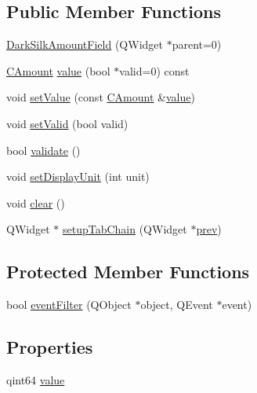 \subsection*{Public Member Functions}
\begin{DoxyCompactItemize}
\item 
\hyperlink{class_dark_silk_amount_field_af3f4dac6cb74424b4c34113a65b0f1dc}{Dark\+Silk\+Amount\+Field} (Q\+Widget $\ast$parent=0)
\item 
\hyperlink{amount_8h_a4eaf3a5239714d8c45b851527f7cb564}{C\+Amount} \hyperlink{class_dark_silk_amount_field_a4d844a57eacd9ce9e0f3e665d0286875}{value} (bool $\ast$valid=0) const 
\item 
void \hyperlink{class_dark_silk_amount_field_af42cc558d9d38dfc7ce682cb8f01ed20}{set\+Value} (const \hyperlink{amount_8h_a4eaf3a5239714d8c45b851527f7cb564}{C\+Amount} \&\hyperlink{class_dark_silk_amount_field_ae533a06697225e95bade6a9df1c6b5d2}{value})
\item 
void \hyperlink{class_dark_silk_amount_field_acaeddf879d2dd948e232d0d7db80672b}{set\+Valid} (bool valid)
\item 
bool \hyperlink{class_dark_silk_amount_field_a6e48d59e5cf6de6469d3abddc7ac1aa2}{validate} ()
\item 
void \hyperlink{class_dark_silk_amount_field_a11567d5cc0b2012727bd915b7d8742c2}{set\+Display\+Unit} (int unit)
\item 
void \hyperlink{class_dark_silk_amount_field_aa54d8b110aa9d74f021917adae6bb33c}{clear} ()
\item 
Q\+Widget $\ast$ \hyperlink{class_dark_silk_amount_field_a13667990af05333c0a9ec59a399efb92}{setup\+Tab\+Chain} (Q\+Widget $\ast$\hyperlink{cache_8cc_aabbd2f01bb8ec4a7a0128bce5f8cdb1b}{prev})
\end{DoxyCompactItemize}
\subsection*{Protected Member Functions}
\begin{DoxyCompactItemize}
\item 
bool \hyperlink{class_dark_silk_amount_field_ab1e185acd242335b4c9ebce6b5b1568d}{event\+Filter} (Q\+Object $\ast$object, Q\+Event $\ast$event)
\end{DoxyCompactItemize}
\subsection*{Properties}
\begin{DoxyCompactItemize}
\item 
qint64 \hyperlink{class_dark_silk_amount_field_ae533a06697225e95bade6a9df1c6b5d2}{value}
\end{DoxyCompactItemize}


